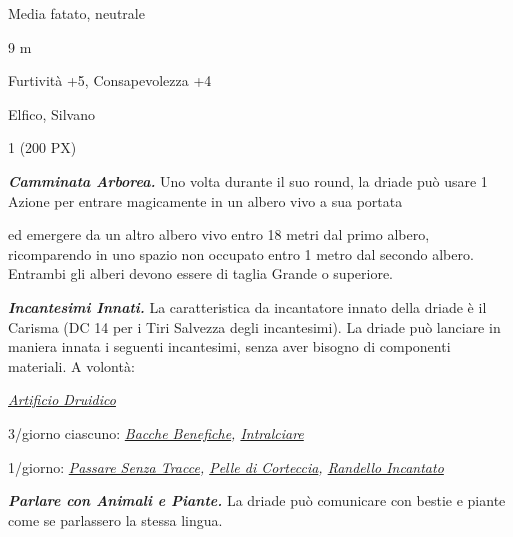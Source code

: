 \begin{multicols}{2}
{
\begin{description}[noitemsep, topsep=0pt, parsep=0pt, partopsep=0pt, itemsep=1pt, leftmargin=2.35cm,  labelwidth=2.2cm, itemindent=0cm, listparindent=0pt] %
\setlength{\baselineskip}{10pt}
\item[\textbf{Taglia/Tipo}] Media fatato, neutrale
\item[\textbf{Caratt.}] 
\item[\textbf{Punti Ferita}] 
\item[\textbf{Movimento}] 9 m
\item[\textbf{Tiri Salvez.}] 
\item[\textbf{Comp.}] Furtività +5, Consapevolezza +4
\item[\textbf{Sensi}] 
\item[\textbf{Linguaggi}] Elfico, Silvano
\item[\textbf{Sfida}] 1 (200 PX)
\end{description}
\smallskip

\emph{\textbf{Camminata Arborea.}} Uno volta durante il suo round, la driade può usare 1 Azione per entrare magicamente in un albero vivo a sua portata

ed emergere da un altro albero vivo entro 18 metri dal primo albero, ricomparendo in uno spazio non occupato entro 1 metro dal secondo albero. Entrambi gli alberi devono essere di taglia Grande o superiore.

\emph{\textbf{Incantesimi Innati.}} La caratteristica da incantatore innato della driade è il Carisma (DC 14 per i Tiri Salvezza degli incantesimi). La driade può lanciare in maniera innata i seguenti incantesimi, senza aver bisogno di componenti materiali. A volontà:

\emph{\hyperlink{Artificio Druidico}{Artificio Druidico}}

3/giorno ciascuno: \emph{\hyperlink{Bacche Benefiche}{Bacche Benefiche}, \hyperlink{Intralciare}{Intralciare}}

1/giorno: \emph{\hyperlink{Passare Senza Tracce}{Passare Senza Tracce}, \hyperlink{Pelle di Corteccia}{Pelle di Corteccia}, \hyperlink{Randello incantato}{Randello Incantato}}

\emph{\textbf{Parlare con Animali e Piante.}} La driade può comunicare con bestie e piante come se parlassero la stessa lingua.

}
\end{multicols}
